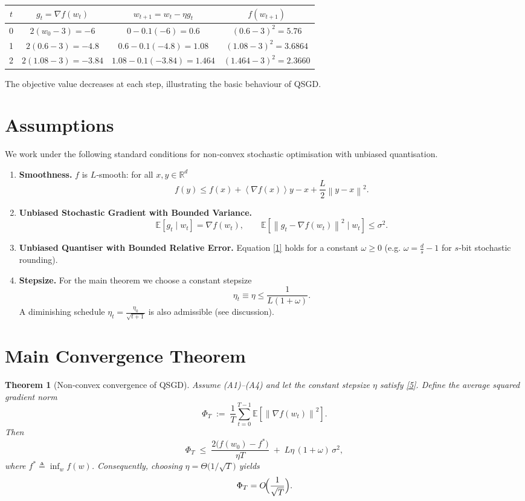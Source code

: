 \documentclass{article}
\newtheorem{theorem}{Theorem}
\newcommand{\EE}{\mathbb{E}}
\newcommand{\RR}{\mathbb{R}}
\newcommand{\norm}[1]{\left\lVert#1\right\rVert}
\newcommand{\inner}[1]{\left\langle#1\right\rangle}
\begin{document}
\begin{center}
\begin{tabular}{c|c|c|c}
$t$ & $g_t=\nabla f(w_t)$ & $w_{t+1}=w_t-\eta g_t$ & $f(w_{t+1})$\\\hline
0 & $2(w_0-3) = -6$ & $0-0.1(-6)=0.6$ & $(0.6-3)^2=5.76$\\
1 & $2(0.6-3) = -4.8$ & $0.6-0.1(-4.8)=1.08$ & $(1.08-3)^2=3.6864$\\
2 & $2(1.08-3) = -3.84$ & $1.08-0.1(-3.84)=1.464$ & $(1.464-3)^2=2.3660$
\end{tabular}
\end{center}
The objective value decreases at each step, illustrating the basic behaviour of QSGD.

\newpage
\section*{Assumptions}
We work under the following standard conditions for non‑convex stochastic optimisation with unbiased quantisation.

\begin{enumerate}[label=(A\arabic*)]
\item \textbf{Smoothness.} $f$ is $L$‑smooth: for all $x,y\in\RR^{d}$
\[
f(y)\le f(x)+\inner{\nabla f(x)}{y-x}+\frac{L}{2}\norm{y-x}^{2}.
\tag{3}
\]

\item \textbf{Unbiased Stochastic Gradient with Bounded Variance.}
\[
\EE\!\left[g_t\mid w_t\right]=\nabla f(w_t),\qquad 
\EE\!\left[\norm{g_t-\nabla f(w_t)}^{2}\mid w_t\right]\le\sigma^{2}.
\tag{4}
\]

\item \textbf{Unbiased Quantiser with Bounded Relative Error.}
Equation \eqref{1} holds for a constant $\omega\ge0$ (e.g. $\omega= \frac{d}{s}-1$ for $s$‑bit stochastic rounding).

\item \textbf{Stepsize.} For the main theorem we choose a constant stepsize
\[
\eta_t\equiv\eta\le\frac{1}{L(1+\omega)}.
\tag{5}
\]
A diminishing schedule $\eta_t=\frac{\eta_0}{\sqrt{t+1}}$ is also admissible (see discussion).
\end{enumerate}

\section*{Main Convergence Theorem}
\begin{theorem}[Non‑convex convergence of QSGD]\label{thm:main}
Assume (A1)–(A4) and let the constant stepsize $\eta$ satisfy \eqref{5}.  
Define the average squared gradient norm
\[
\Phi_T\;:=\;\frac{1}{T}\sum_{t=0}^{T-1}\EE\!\left[\norm{\nabla f(w_t)}^{2}\right].
\]
Then
\[
\boxed{\Phi_T\;\le\;
\frac{2\bigl(f(w_0)-f^{*}\bigr)}{\eta T}
\;+\;
L\eta\,(1+\omega)\,\sigma^{2}},
\tag{6}
\]
where $f^{*}\triangleq\inf_{w}f(w)$.
Consequently, choosing $\eta=\Theta\!\bigl(1/\sqrt{T}\bigr)$ yields
\[
\Phi_T = O\!\Bigl(\frac{1}{\sqrt{T}}\Bigr).
\]
\end{theorem}
\end{document}
